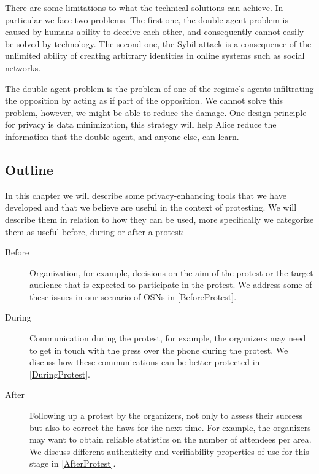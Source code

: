 There are some limitations to what the technical solutions can achieve.
In particular we face two problems.
The first one, the double agent problem is caused by humans ability to deceive 
each other, and consequently cannot easily be solved by technology.
The second one, the Sybil attack is a consequence of the unlimited ability of creating 
arbitrary identities in online systems such as social networks.

\label{DoubleAgentProblem}
The double agent problem is the problem of one of the regime's agents 
infiltrating the opposition by acting as if part of the opposition.
We cannot solve this problem, however, we might be able to reduce the damage.
One design principle for privacy is data minimization, this strategy will help 
Alice reduce the information that the double agent, and anyone else, can learn.

\label{SybilAttacks}


\subsection{Outline}
\label{Outline}

In this chapter we will describe some privacy-enhancing tools that we have 
developed and that we believe are useful in the context of protesting.
We will describe them in relation to how they can be used, more specifically we 
categorize them as useful before, during or after a protest:
\begin{description}
  \item[Before]
    Organization, for example, decisions on the aim of the protest or the 
    target audience that is expected to participate in the protest.
    We address some of these issues in our scenario of \acp{OSN} in 
    \cref{BeforeProtest}.

  \item[During]
    Communication during the protest, for example, the organizers may need to 
    get in touch with the press over the phone during the protest.
    We discuss how these communications can be better protected in 
    \cref{DuringProtest}.

  \item[After]
    Following up a protest by the organizers, not only to assess their success 
    but also to correct the flaws for the next time.  For example, the 
    organizers may want to obtain reliable statistics on the number of 
    attendees per area.
    We discuss different authenticity and verifiability properties of use for 
    this stage in \cref{AfterProtest}.
\end{description}

